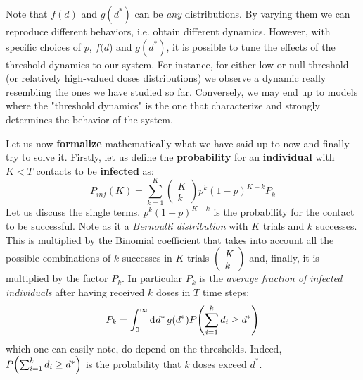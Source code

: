 \documentclass[../main/main.tex]{subfiles}
\begin{document}
Note that \( f(d) \) and \( g(d^*) \) can be \textit{any} distributions. By varying them we can reproduce different behaviors, i.e. obtain different dynamics. However, with specific choices of $p$, $f(d$) and $g(d^*)$, it is possible to tune the effects of the threshold dynamics to our system. For instance, for either low or null threshold (or relatively high-valued doses distributions) we observe a dynamic really resembling the ones we have studied so far. Conversely, we may end up to models where the "threshold dynamics" is the one that characterize and strongly determines the behavior of the system.


Let us now \textbf{formalize} mathematically what we have said up to now and finally try to solve it. Firstly, let us define the \textbf{probability} for an \textbf{individual} with \( K < T  \) contacts to be \textbf{infected} as:
\begin{equation}
  P_{inf} (K) = \sum_{k=1}^{K} \begin{pmatrix}
  K \\
  k
  \end{pmatrix}
  p^k (1-p)^{K-k} P_k
\end{equation}
Let us discuss the single terms. \( p^k (1-p)^{K-k} \) is the probability for the contact to be successful. Note as it a \textit{Bernoulli distribution} with \( K \) trials and \( k \) successes. This is multiplied by the Binomial coefficient that takes into account all the possible combinations of $k$ successes in $K$ trials \( \begin{pmatrix}
K \\
k
\end{pmatrix}  \) and, finally, it is multiplied by the factor \( P_k \).
In particular  \( P_k \) is the \textit{average fraction of infected individuals} after having received \( k \) doses in \( T \) time steps:
\begin{equation}
  P_k = \int_{0}^{\infty }  \dd[]{d^*} g(d^*) P \qty(\sum_{i=1}^{k} d_i \ge d^*  )
\end{equation}
which one can easily note, do depend on the thresholds. Indeed, \(  P \qty(\sum_{i=1}^{k} d_i \ge d^*  )  \) is the probability that \( k \) doses exceed \( d^* \).
\end{document}
